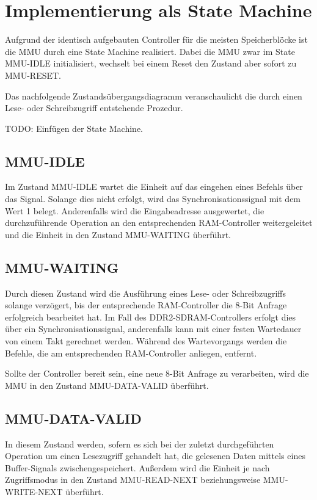 \section{Implementierung als State Machine}

Aufgrund der identisch aufgebauten Controller f\"ur die meisten Speicherbl\"ocke ist die MMU durch eine State Machine realisiert. Dabei die MMU zwar im State MMU-IDLE initialisiert, wechselt bei einem Reset den Zustand aber sofort zu MMU-RESET.

Das nachfolgende Zustands\"ubergangsdiagramm veranschaulicht die durch einen Lese- oder Schreibzugriff entstehende Prozedur.

TODO: Einf\"ugen der State Machine.

\subsection{MMU-IDLE}

Im Zustand MMU-IDLE wartet die Einheit auf das eingehen eines Befehls \"uber das  Signal. Solange dies nicht erfolgt, wird das Synchronisationssignal  mit dem Wert 1 belegt. Anderenfalls wird die Eingabeadresse ausgewertet, die durchzuf\"uhrende Operation an den entsprechenden RAM-Controller weitergeleitet und die Einheit in den Zustand MMU-WAITING \"uberf\"uhrt.

\subsection{MMU-WAITING}

Durch diesen Zustand wird die Ausf\"uhrung eines Lese- oder Schreibzugriffs solange verz\"ogert, bis der entsprechende RAM-Controller die 8-Bit Anfrage erfolgreich bearbeitet hat. Im Fall des DDR2-SDRAM-Controllers erfolgt dies \"uber ein Synchronisationssignal, anderenfalls kann mit einer festen Wartedauer von einem Takt gerechnet werden. W\"ahrend des Wartevorgangs werden die Befehle, die am entsprechenden RAM-Controller anliegen, entfernt.

Sollte der Controller bereit sein, eine neue 8-Bit Anfrage zu verarbeiten, wird die MMU in den Zustand MMU-DATA-VALID \"uberf\"uhrt.

\subsection{MMU-DATA-VALID}
In diesem Zustand werden, sofern es sich bei der zuletzt durchgef\"uhrten Operation um einen Lesezugriff gehandelt hat, die gelesenen Daten mittels eines Buffer-Signals zwischengespeichert. Au\ss{}erdem wird die Einheit je nach Zugriffsmodus in den Zustand MMU-READ-NEXT beziehungsweise MMU-WRITE-NEXT \"uberf\"uhrt.

